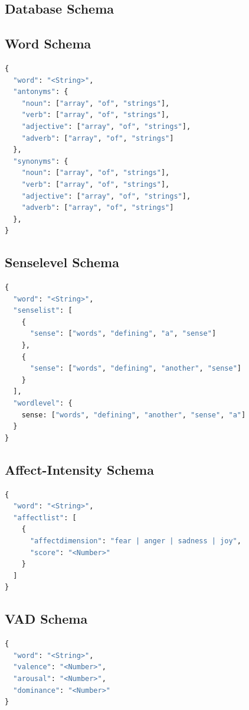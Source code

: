 \documentclass[11pt, twoside, reqno]{book}
\begin{document}
\begin{appendices}

\chapter{Database Schema}
\section{Word Schema}
\begin{lstlisting}[language=Python]
{
  "word": "<String>",
  "antonyms": {
    "noun": ["array", "of", "strings"],
    "verb": ["array", "of", "strings"],
    "adjective": ["array", "of", "strings"],
    "adverb": ["array", "of", "strings"]
  },
  "synonyms": {
    "noun": ["array", "of", "strings"],
    "verb": ["array", "of", "strings"],
    "adjective": ["array", "of", "strings"],
    "adverb": ["array", "of", "strings"]
  },
}
\end{lstlisting}

\section{Senselevel Schema}
\begin{lstlisting}[language=Python]
{
  "word": "<String>",
  "senselist": [
    {
      "sense": ["words", "defining", "a", "sense"]
    },
    {
      "sense": ["words", "defining", "another", "sense"]
    }
  ],
  "wordlevel": {
    sense: ["words", "defining", "another", "sense", "a"]
  }
}
\end{lstlisting}

\section{Affect-Intensity Schema}
\begin{lstlisting}[language=Python]
{
  "word": "<String>",
  "affectlist": [
    {
      "affectdimension": "fear | anger | sadness | joy",
      "score": "<Number>"
    }
  ]
}
\end{lstlisting}

\section{VAD Schema}
\begin{lstlisting}[language=Python]
{
  "word": "<String>",
  "valence": "<Number>",
  "arousal": "<Number>",
  "dominance": "<Number>"
}
\end{lstlisting}


\end{appendices}
\end{document}
